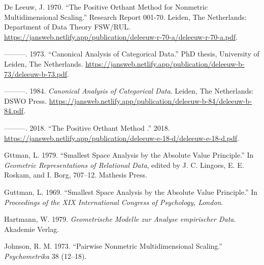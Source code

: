 \documentclass[
  12pt,
]{article}
\newlength{\cslhangindent}
\newenvironment{CSLReferences}[2] %
 {\begin{list}{}{%
  \setlength{\itemindent}{0pt}
  \setlength{\leftmargin}{0pt}
  \setlength{\parsep}{0pt}
  \ifodd #1
   \setlength{\leftmargin}{\cslhangindent}
   \setlength{\itemindent}{-1\cslhangindent}
  \fi
  \setlength{\itemsep}{#2\baselineskip}}}
 {\end{list}}
\begin{document}
\label{refs}
\begin{CSLReferences}{1}{0}
De Leeuw, J. 1970. {``The Positive Orthant Method for Nonmetric Multidimensional Scaling.''} Research Report 001-70. Leiden, The Netherlands: Department of Data Theory FSW/RUL. \url{https://jansweb.netlify.app/publication/deleeuw-r-70-a/deleeuw-r-70-a.pdf}.

---------. 1973. {``Canonical Analysis of Categorical Data.''} PhD thesis, University of Leiden, The Netherlands. \url{https://jansweb.netlify.app/publication/deleeuw-b-73/deleeuw-b-73.pdf}.

---------. 1984. \emph{Canonical Analysis of Categorical Data}. Leiden, The Netherlands: DSWO Press. \url{https://jansweb.netlify.app/publication/deleeuw-b-84/deleeuw-b-84.pdf}.

---------. 2018. {``{The Positive Orthant Method }.''} 2018. \url{https://jansweb.netlify.app/publication/deleeuw-e-18-d/deleeuw-e-18-d.pdf}.

Gttman, L. 1979. {``Smallest Space Analysis by the Absolute Value Principle.''} In \emph{{Geometric Representations of Relational Data}}, edited by J. C. Lingoes, E. E. Roskam, and I. Borg, 707--12. Mathesis Press.

Guttman, L. 1969. {``{Smallest Space Analysis by the Absolute Value Principle}.''} In \emph{{Proceedings of the XIX International Congress of Psychology, London}}.

Hartmann, W. 1979. \emph{{Geometrische Modelle zur Analyse empirischer Data}}. Akademie Verlag.

Johnson, R. M. 1973. {``{Pairwise Nonmetric Multidimensional Scaling}.''} \emph{Psychometrika} 38 (12--18).

\end{CSLReferences}
\end{document}
